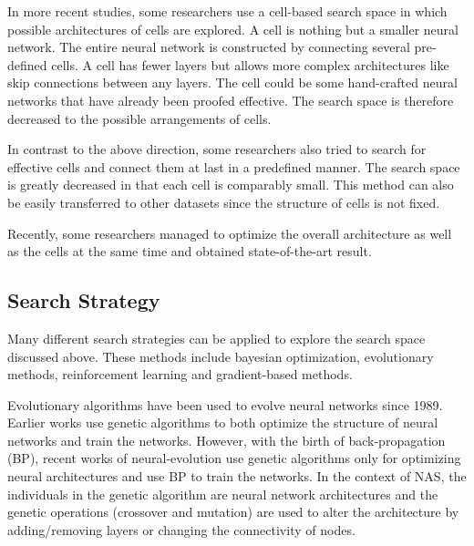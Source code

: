 \documentclass{article}
\begin{document}
\begin{normalsize}
   In more recent studies, some researchers use a cell-based search space in which possible architectures of cells are explored. A cell is nothing but a smaller neural network. The entire neural network is constructed by connecting several pre-defined cells. A cell has fewer layers but allows more complex architectures like skip connections between any layers\cite{cai2018path}\cite{real2018regularized}. The cell could be some hand-crafted neural networks that have already been proofed effective. The search space is therefore decreased to the possible arrangements of cells.

   In contrast to the above direction, some researchers also tried to search for effective cells and connect them at last in a predefined manner\cite{zoph2018learning}\cite{cai2018path}. The search space is greatly decreased in that each cell is comparably small. This method can also be easily transferred to other datasets\cite{zoph2018learning} since the structure of cells is not fixed.

   Recently, some researchers managed to optimize the overall architecture as well as the cells at the same time and obtained state-of-the-art result\cite{liu2019auto}.
   
   \subsection{Search Strategy}
   
   Many different search strategies can be applied to explore the search space discussed above. These methods include bayesian optimization, evolutionary methods, reinforcement learning and gradient-based methods. 

   Evolutionary algorithms have been used to evolve neural networks since 1989\cite{miller1989designing}. Earlier works use genetic algorithms to both optimize the structure of neural networks and train the networks\cite{stanley2002evolving}. However, with the birth of back-propagation (BP), recent works of neural-evolution use genetic algorithms only for optimizing neural architectures and use BP to train the networks\cite{real2017large}. In the context of NAS, the individuals in the genetic algorithm are neural network architectures and the genetic operations (crossover and mutation) are used to alter the architecture by adding/removing layers or changing the connectivity of nodes.


\end{normalsize}
\end{document}
